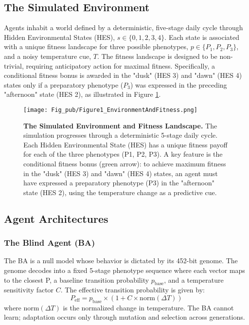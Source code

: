 \documentclass[aps,pre,twocolumn,floatfix,nofootinbib,amsmath,amssymb]{revtex4-2}
\begin{document}
\subsection{The Simulated Environment}
Agents inhabit a world defined by a deterministic, five-stage daily cycle through Hidden Environmental States (HES), \(s \in \{0, 1, 2, 3, 4\}\). Each state is associated with a unique fitness landscape for three possible phenotypes, \(p \in \{P_1, P_2, P_3\}\), and a noisy temperature cue, \(T\). The fitness landscape is designed to be non-trivial, requiring anticipatory action for maximal fitness. Specifically, a conditional fitness bonus is awarded in the "dusk" (HES 3) and "dawn" (HES 4) states only if a preparatory phenotype (\(P_3\)) was expressed in the preceding "afternoon" state (HES 2), as illustrated in Figure \ref{fig:environment}.

\begin{figure}
    \centering
    \texttt{[image: Fig\_pub/Figure1\_EnvironmentAndFitness.png]}
    \caption{\textbf{The Simulated Environment and Fitness Landscape.} The simulation progresses through a deterministic 5-stage daily cycle. Each Hidden Environmental State (HES) has a unique fitness payoff for each of the three phenotypes (P1, P2, P3). A key feature is the conditional fitness bonus (green arrow): to achieve maximum fitness in the "dusk" (HES 3) and "dawn" (HES 4) states, an agent must have expressed a preparatory phenotype (P3) in the "afternoon" state (HES 2), using the temperature change as a predictive cue.}
    \label{fig:environment}
\end{figure}

\subsection{Agent Architectures}
\subsubsection{The Blind Agent (BA)}
The BA is a null model whose behavior is dictated by its 452-bit genome. The genome decodes into a fixed 5-stage phenotype sequence where each vector maps to the closest P, a baseline transition probability \(p_{\text{base}}\), and a temperature sensitivity factor \(C\). The effective transition probability is given by:
\begin{equation}
P_{\text{eff}} = p_{\text{base}} \times (1 + C \times \text{norm}(\Delta T))
\end{equation}
where \(\text{norm}(\Delta T)\) is the normalized change in temperature. 
The BA cannot learn; adaptation occurs only through mutation and selection across generations.
\end{document}
